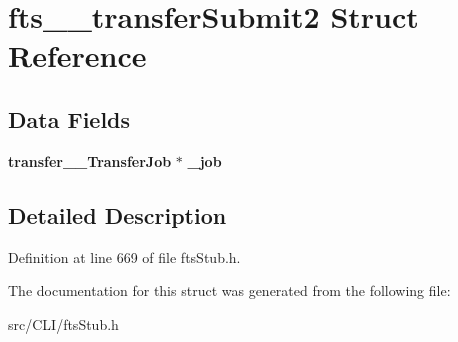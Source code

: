 \section{fts\_\-\_\-transferSubmit2 Struct Reference}
\label{structfts____transferSubmit2}
\subsection*{Data Fields}
\begin{DoxyCompactItemize}
\item 
{\bf transfer\_\-\_\-TransferJob} $\ast$ {\bfseries \_\-job}\label{structfts____transferSubmit2_a5621c5671428dab295c50903b59c5fb5}

\end{DoxyCompactItemize}


\subsection{Detailed Description}


Definition at line 669 of file ftsStub.h.



The documentation for this struct was generated from the following file:\begin{DoxyCompactItemize}
\item 
src/CLI/ftsStub.h\end{DoxyCompactItemize}
